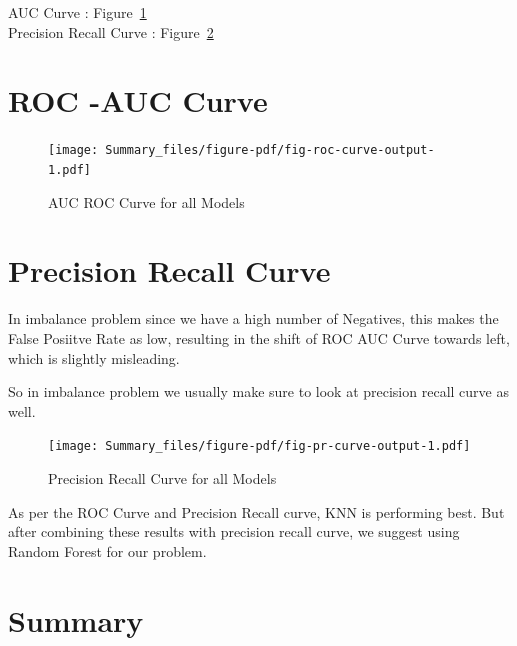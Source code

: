 \documentclass[
  letterpaper,
  DIV=11,
  numbers=noendperiod]{scrartcl}
\begin{document}
AUC Curve : Figure~\ref{fig-roc-curve}\\
Precision Recall Curve : Figure~\ref{fig-pr-curve}

\hypertarget{roc--auc-curve}{%
\section{ROC -AUC Curve}\label{roc--auc-curve}}

\begin{figure}

{\centering \texttt{[image: Summary\_files/figure-pdf/fig-roc-curve-output-1.pdf]}

}

\caption{\label{fig-roc-curve}AUC ROC Curve for all Models}

\end{figure}

\hypertarget{precision-recall-curve}{%
\section{Precision Recall Curve}\label{precision-recall-curve}}

In imbalance problem since we have a high number of Negatives, this
makes the False Posiitve Rate as low, resulting in the shift of ROC AUC
Curve towards left, which is slightly misleading.

So in imbalance problem we usually make sure to look at precision recall
curve as well.

\begin{figure}

{\centering \texttt{[image: Summary\_files/figure-pdf/fig-pr-curve-output-1.pdf]}

}

\caption{\label{fig-pr-curve}Precision Recall Curve for all Models}

\end{figure}

As per the ROC Curve and Precision Recall curve, KNN is performing best.
But after combining these results with precision recall curve, we
suggest using Random Forest for our problem.

\hypertarget{summary}{%
\section{Summary}\label{summary}}
\end{document}

